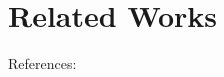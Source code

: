 \section{Related Works}
\label{sec:related-works}

References: \cite{knuth1984texbook,erdos1959random}

\lipsum[1]
